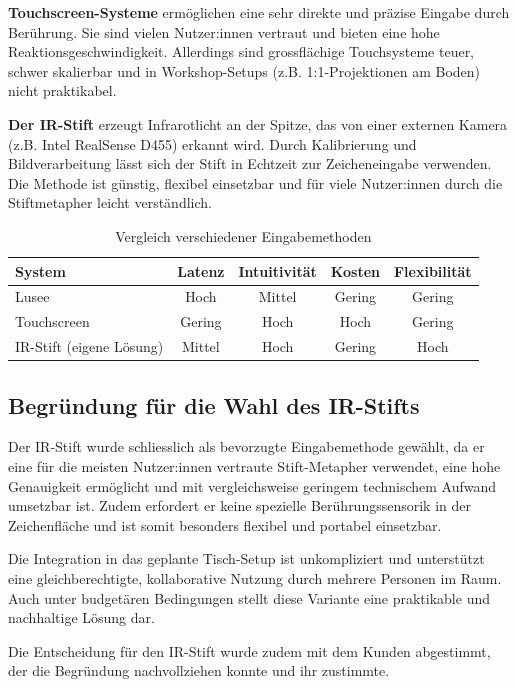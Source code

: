 \textbf{Touchscreen-Systeme} ermöglichen eine sehr direkte und präzise Eingabe durch Berührung. Sie sind vielen Nutzer:innen vertraut und bieten eine hohe Reaktionsgeschwindigkeit. Allerdings sind grossflächige Touchsysteme teuer, schwer skalierbar und in Workshop-Setups (z.B. 1:1-Projektionen am Boden) nicht praktikabel.

\textbf{Der IR-Stift} erzeugt Infrarotlicht an der Spitze, das von einer externen Kamera (z.B. Intel RealSense D455) erkannt wird. Durch Kalibrierung und Bildverarbeitung lässt sich der Stift in Echtzeit zur Zeicheneingabe verwenden. Die Methode ist günstig, flexibel einsetzbar und für viele Nutzer:innen durch die Stiftmetapher leicht verständlich.

\begin{table}[H]
\centering
\caption{Vergleich verschiedener Eingabemethoden}
\label{tab:inputvergleich}
\begin{tabular}{lcccc}
\toprule
\textbf{System} & \textbf{Latenz} & \textbf{Intuitivität} & \textbf{Kosten} & \textbf{Flexibilität} \\
\midrule
Lusee & Hoch & Mittel & Gering & Gering \\
Touchscreen & Gering & Hoch & Hoch & Gering \\
IR-Stift (eigene Lösung) & Mittel & Hoch & Gering & Hoch \\
\bottomrule
\end{tabular}
\end{table}

\clearpage

\subsection{Begründung für die Wahl des IR-Stifts}

Der IR-Stift wurde schliesslich als bevorzugte Eingabemethode gewählt, da er eine für die meisten Nutzer:innen vertraute Stift-Metapher verwendet, eine hohe Genauigkeit ermöglicht und mit vergleichsweise geringem technischem Aufwand umsetzbar ist. Zudem erfordert er keine spezielle Berührungssensorik in der Zeichenfläche und ist somit besonders flexibel und portabel einsetzbar.

Die Integration in das geplante Tisch-Setup ist unkompliziert und unterstützt eine gleichberechtigte, kollaborative Nutzung durch mehrere Personen im Raum. Auch unter budgetären Bedingungen stellt diese Variante eine praktikable und nachhaltige Lösung dar.

Die Entscheidung für den IR-Stift wurde zudem mit dem Kunden abgestimmt, der die Begründung nachvollziehen konnte und ihr zustimmte.


